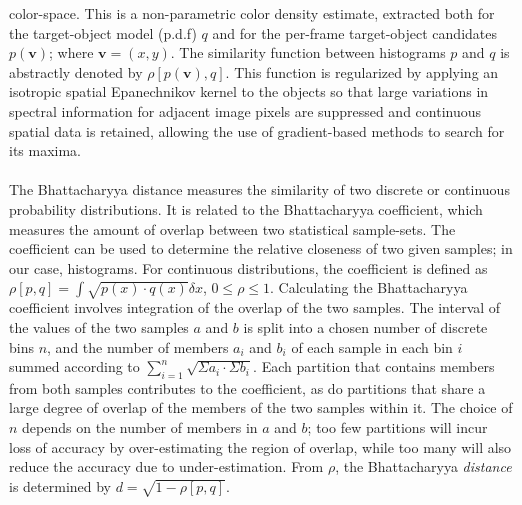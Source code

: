 \documentclass[a4paper,11pt]{article}
\newcommand{\tbf}{\textbf}
\begin{document}
		color-space. This is a non-parametric color density estimate, extracted both
		for the target-object model (p.d.f) $q$ and for the per-frame target-object
		candidates $p(\tbf{v})$; where $\tbf{v} = (x, y)$. The similarity function
		between histograms $p$ and $q$ is abstractly denoted by $\rho[p(\tbf{v}), q]$.
		This function is regularized by applying an isotropic spatial Epanechnikov kernel
		to the objects so that large variations in spectral information for adjacent image
		pixels are suppressed and continuous spatial data is retained, allowing the use of
		gradient-based methods to search for its maxima.
		\\ \\
		The Bhattacharyya distance measures the similarity of two discrete or continuous
		probability distributions. It is related to the Bhattacharyya coefficient, which
		measures the amount of overlap between two statistical sample-sets. The coefficient
		can be used to determine the relative closeness of two given samples; in our case,
		histograms. For continuous distributions, the coefficient is defined as
		$\rho[p, q] = \int \sqrt{p(x) \cdot q(x) } \delta x$, $0 \leq \rho \leq 1$.
		Calculating the Bhattacharyya coefficient involves integration of the overlap
		of the two samples. The interval of the values of the two samples $a$ and $b$
		is split into a chosen number of discrete bins $n$, and the number of members
		$a_i$ and $b_i$ of each sample in each bin $i$ summed according to
		$\sum_{i=1}^{n} \sqrt{\Sigma a_i \cdot \Sigma b_i}$. Each partition that contains
		members from both samples contributes to the coefficient, as do partitions that
		share a large degree of overlap of the members of the two samples  within it. The
		choice of $n$ depends on the number of members in $a$ and $b$; too few partitions
		will incur loss of accuracy by over-estimating the region of overlap, while too many
		will also reduce the accuracy due to under-estimation. From $\rho$, the Bhattacharyya
		\textit{distance} is determined by $d = \sqrt{1 - \rho[p, q]}$.
\end{document}
